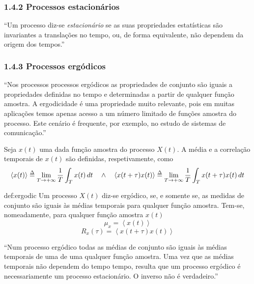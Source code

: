 \subsubsection{1.4.2 Processos estacionários}

``Um processo diz-se \textit{estacionário} se as suas propriedades estatísticas são invariantes a translações no tempo, ou, de forma equivalente, não dependem da origem dos tempos.''\cite{Dias2011}

\subsubsection{1.4.3 Processos ergódicos}

``Nos processos processos ergódicos as propriedades de conjunto são iguais a propriedades definidas no tempo e determinadas a partir de qualquer função amostra. A ergodicidade é uma propriedade muito relevante, pois em muitas aplicações temos apenas acesso a um número limitado de funções amostra do processo. Este cenário é frequente, por exemplo, no estudo de sistemas de comunicação.''\cite{Dias2011}

\vspace{0.75em}
\noindent Seja $x(t)$ uma dada função amostra do processo $X(t)$. A média e a correlação temporais de $x(t)$ são definidas, respetivamente, como
$$
    \left< x(t) \right> \delequal \lim_{T \to +\infty} \frac{1}{T} \int_{T} x(t)\, dt\quad \land \quad 
    \left< x(t+\tau)x(t) \right> \delequal \lim_{T \to +\infty} \frac{1}{T} \int_{T} x(t+\tau)x(t)\, dt
$$

\begin{theo}{def:ergodic}\label{def:ergodic}
    Um processo $X(t)$ diz-se ergódico, se, e somente se, as medidas de conjunto são iguais às médias temporais para qualquer função amostra. Tem-se, nomeadamente, para qualquer função amostra $x(t)$
    $$
        \mu_x = \left< x(t) \right>
    $$
    $$
        R_x(\tau) = \left< x(t+\tau)x(t) \right>
    $$
\end{theo}

\noindent ``Num processo ergódico todas as médias de conjunto são iguais às médias temporais de uma de uma qualquer função amostra. Uma vez que as médias temporais não dependem do tempo tempo, resulta que um processo ergódico é necessariamente um processo estacionário. O inverso não é verdadeiro.''\cite{Dias2011}

